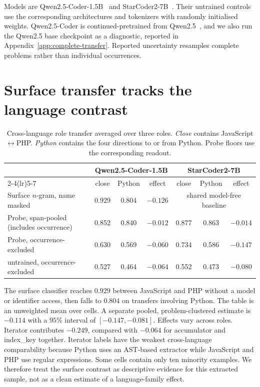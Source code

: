 \documentclass{article}
\begin{document}
Models are Qwen2.5-Coder-1.5B~\citep{hui2024qwencoder} and
StarCoder2-7B~\citep{lozhkov2024starcoder2}. Their untrained controls use the
corresponding architectures and tokenizers with randomly initialised weights.
Qwen2.5-Coder is continued-pretrained from Qwen2.5~\citep{qwen2024qwen25}, and
we also run the Qwen2.5 base checkpoint as a diagnostic, reported in
Appendix~\ref{app:complete-transfer}. Reported uncertainty resamples complete
problems rather than individual occurrences.

\section{Surface transfer tracks the language contrast}

\begin{table}[t]
\centering
\caption{Cross-language role transfer averaged over three roles. \emph{Close}
contains JavaScript$\leftrightarrow$PHP. \emph{Python} contains the four
directions to or from Python. Probe floors use the corresponding readout.}
\label{tab:main}
\small
\begin{tabular}{lcccccc}
\toprule
 & \multicolumn{3}{c}{Qwen2.5-Coder-1.5B} & \multicolumn{3}{c}{StarCoder2-7B} \\
\cmidrule(lr){2-4}\cmidrule(lr){5-7}
 & close & Python & effect & close & Python & effect \\
\midrule
Surface $n$-gram, name masked & 0.929 & 0.804 & $-0.126$ & \multicolumn{3}{c}{shared model-free baseline} \\
\midrule
Probe, span-pooled (includes occurrence) & 0.852 & 0.840 & $-0.012$ & 0.877 & 0.863 & $-0.014$ \\
\midrule
Probe, occurrence-excluded & 0.630 & 0.569 & $-0.060$ & 0.734 & 0.586 & $-0.147$ \\
\quad untrained, occurrence-excluded & 0.527 & 0.464 & $-0.064$ & 0.552 & 0.473 & $-0.080$ \\
\bottomrule
\end{tabular}
\end{table}

The surface classifier reaches $0.929$ between JavaScript and PHP without a
model or identifier access, then falls to $0.804$ on transfers involving
Python. The table is an unweighted mean over cells. A separate pooled,
problem-clustered estimate is $-0.114$ with a $95\%$ interval of
$[-0.147,-0.081]$. Effects vary across roles. Iterator contributes
$-0.249$, compared with $-0.064$ for accumulator and index\_key together.
Iterator labels have the weakest cross-language comparability because Python uses an
AST-based extractor while JavaScript and PHP use regular expressions. Some
cells contain only ten minority examples. We therefore treat the surface
contrast as descriptive evidence for this extracted sample, not as a clean
estimate of a language-family effect.
\end{document}
